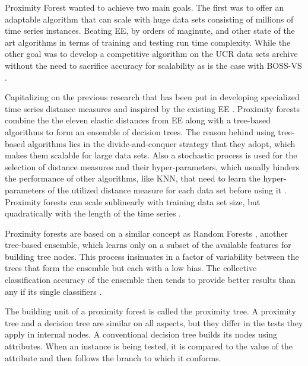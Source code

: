 Proximity Forest wanted to achieve two main goals. The first was to offer an adaptable algorithm that can scale with huge data sets consisting of millions of time series instances.
Beating EE, by orders of maginute, and other state of the art algorithms in terms of training and testing run time complexity.
While the other goal was to develop a competitive algorithm on the UCR data sets archive without the need to sacrifice accuracy for scalability as is the case with BOSS-VS \cite{lucas2019proximity}.


Capitalizing on the previous research that has been put in developing specialized time series distance measures and inspired by the existing EE \cite{fawaz2020inceptiontime,fawaz2019deep}.
Proximity forests combine the the eleven elastic distances from EE along with a tree-based algorithms to form an ensemble of decision trees.
The reason behind using tree-based algorithms lies in the divide-and-conquer strategy that they adopt, which makes them scalable for large data sets.
Also a stochastic process is used for the selection of distance measures and their hyper-parameters, which usually hinders the performance of other algorithms,
like KNN, that need to learn the hyper-parameters of the utilized distance measure for each data set before using it \cite{lucas2019proximity}.
Proximity forests can scale sublinearly with training data set size, but quadratically with the length of the time series \cite{shifaz2020ts}.

Proximity forests are based on a similar concept as Random Forests \cite{breiman2001random}, another tree-based ensemble, which learns only on a subset of the available features
for building tree nodes. This process insinuates in a factor of variability between the trees that form the ensemble but each with a low bias.
The collective classification accuracy of the ensemble then tends to provide better results than any if its single classifiers \cite{lucas2019proximity}.

The building unit of a proximity forest is called the proximity tree. A proximity tree and a decision tree are similar on all aspects,
but they differ in the tests they apply in internal nodes.
A conventional decision tree builds its nodes using attributes. When an instance is being tested, it is compared to the value of the attribute
and then follows the branch to which it conforms.

